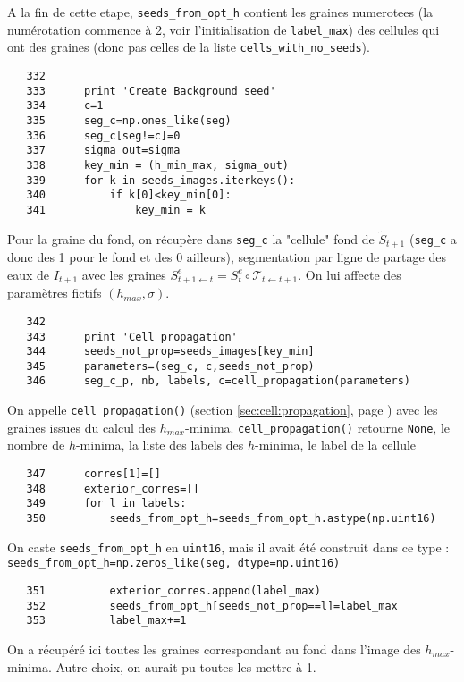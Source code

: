 \documentclass{article}
\def \mycolor {red}
\begin{document}
\color{\mycolor}
A la fin de cette etape, \verb|seeds_from_opt_h| contient les graines numerotees (la num\'erotation commence \`a 2, voir l'initialisation de \verb|label_max|) des cellules qui ont des graines (donc pas celles de la liste \verb|cells_with_no_seeds|).  
\color{black}
\begin{verbatim}   
   332	
   333		print 'Create Background seed'
   334	    c=1
   335	    seg_c=np.ones_like(seg)
   336	    seg_c[seg!=c]=0
   337	    sigma_out=sigma
   338	    key_min = (h_min_max, sigma_out)
   339	    for k in seeds_images.iterkeys():
   340	    	if k[0]<key_min[0]:
   341	    		key_min = k
\end{verbatim} 
\color{\mycolor}
Pour la graine du fond, on r\'ecup\`ere dans \verb|seg_c| la "cellule" fond de $\tilde{S}_{t+1}$ (\verb|seg_c| a donc des 1 pour le fond et des 0 ailleurs), segmentation par ligne de partage des eaux de $I_{t+1}$ avec les graines $S^e_{t+1 \leftarrow t} = S^e_t \circ \mathcal{T}_{t \leftarrow t+1}$. On lui affecte des param\`etres fictifs $(h_{max}, \sigma)$.
\color{black}
\begin{verbatim}
   342	
   343	    print 'Cell propagation'
   344	    seeds_not_prop=seeds_images[key_min]
   345	    parameters=(seg_c, c,seeds_not_prop)
   346	    seg_c_p, nb, labels, c=cell_propagation(parameters)
\end{verbatim} 
\color{\mycolor}
On appelle \texttt{cell\_propagation()} (section \ref{sec:cell:propagation}, page \pageref{sec:cell:propagation}) avec les graines issues du calcul des $h_{max}$-minima. \texttt{cell\_propagation()} retourne \texttt{None}, le nombre de $h$-minima, la liste des labels des $h$-minima, le label de la cellule
\color{black}
\begin{verbatim}
   347	    corres[1]=[]
   348	    exterior_corres=[]
   349	    for l in labels:
   350	        seeds_from_opt_h=seeds_from_opt_h.astype(np.uint16)
\end{verbatim} 
\color{\mycolor}
On caste \verb|seeds_from_opt_h| en \verb|uint16|, mais il avait \'et\'e construit dans ce type : 
\verb|seeds_from_opt_h=np.zeros_like(seg, dtype=np.uint16)|
\color{black}
\begin{verbatim}
   351	        exterior_corres.append(label_max)
   352	        seeds_from_opt_h[seeds_not_prop==l]=label_max
   353	        label_max+=1
\end{verbatim} 
\color{\mycolor}
On a r\'ecup\'er\'e ici toutes les graines correspondant au fond dans l'image des $h_{max}$-minima. Autre choix, on aurait pu toutes les mettre \`a 1.
\end{document}
